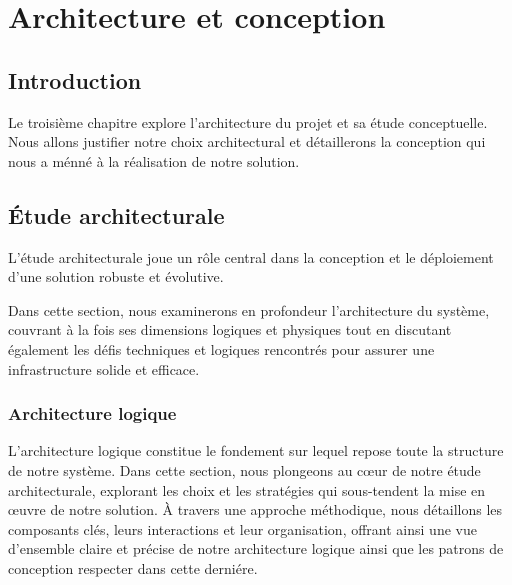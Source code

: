 \chapter{Architecture et conception}

\section*{Introduction}
\par Le troisième chapitre explore l'architecture du projet et sa étude conceptuelle. 
Nous allons justifier notre choix architectural et détaillerons la conception qui nous 
a ménné à la réalisation de notre solution.

\section{Étude architecturale}
\par  L'étude architecturale joue un rôle central dans la conception et le déploiement d'une solution robuste et évolutive.
\par Dans cette section, nous examinerons en profondeur l'architecture du système, couvrant à la fois ses dimensions logiques 
et physiques tout en discutant également les défis techniques et logiques rencontrés pour assurer une infrastructure solide et efficace.

\subsection{Architecture logique}
\par L'architecture logique constitue le fondement sur lequel repose toute la structure de notre système. Dans cette section, nous plongeons au cœur de notre étude architecturale,
 explorant les choix et les stratégies qui sous-tendent la mise en œuvre de notre solution. À travers une approche méthodique, nous détaillons les composants clés, leurs interactions et leur organisation,
  offrant ainsi une vue d'ensemble claire et précise de notre architecture logique ainsi que les patrons de conception respecter dans cette derniére.

